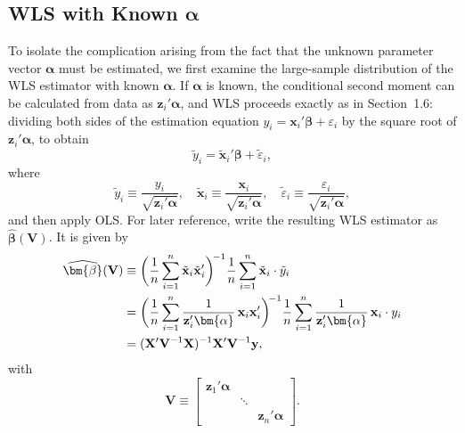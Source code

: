 \subsection*{WLS with Known $\bm{\alpha}$}

To isolate the complication arising from the fact that the unknown parameter vector
$\bm{\alpha}$ must be estimated, we first examine the large-sample distribution of the
WLS estimator with known $\bm{\alpha}$.  If $\bm{\alpha}$ is known, the conditional
second moment can be calculated from data as $\mathbf{z}_i' \bm{\alpha}$, and WLS
proceeds exactly as in Section~1.6: dividing both sides of the estimation equation
$y_i = \mathbf{x}_i' \bm{\beta} + \varepsilon_i$ by the square root of
$\mathbf{z}_i' \bm{\alpha}$, to obtain
\begin{equation}
  \tilde{y}_i = \tilde{\mathbf{x}}_i' \bm{\beta} + \tilde{\varepsilon}_i,
  \label{eq:2.8.3}
\end{equation}
where
\[
  \tilde{y}_i \equiv \frac{y_i}{\sqrt{\mathbf{z}_i' \bm{\alpha}}}, \quad
  \tilde{\mathbf{x}}_i \equiv \frac{\mathbf{x}_i}{\sqrt{\mathbf{z}_i' \bm{\alpha}}},
    \quad
  \tilde{\varepsilon}_i \equiv \frac{\varepsilon_i}{\sqrt{\mathbf{z}_i' \bm{\alpha}}},
\]
and then apply OLS.  For later reference, write the resulting WLS estimator as
$\widehat{\bm{\beta}}(\mathbf{V})$.  It is given by
\begin{align}
  \widehat{\bm{\beta}}(\mathbf{V})
    &\equiv \biggl(\frac{1}{n} \sum_{i=1}^{n}
      \tilde{\mathbf{x}}_i \tilde{\mathbf{x}}_i'\biggr)^{\!-1}
      \frac{1}{n} \sum_{i=1}^{n}
      \tilde{\mathbf{x}}_i \cdot \tilde{y}_i \notag \\
    &= \biggl(\frac{1}{n} \sum_{i=1}^{n}
      \frac{1}{\mathbf{z}_i' \bm{\alpha}}\,
      \mathbf{x}_i \mathbf{x}_i'\biggr)^{\!-1}
      \frac{1}{n} \sum_{i=1}^{n}
      \frac{1}{\mathbf{z}_i' \bm{\alpha}}\,
      \mathbf{x}_i \cdot y_i \notag \\
    &= (\mathbf{X}' \mathbf{V}^{-1} \mathbf{X})^{-1}
      \mathbf{X}' \mathbf{V}^{-1} \mathbf{y},
  \label{eq:2.8.4}
\end{align}
with
\[
  \mathbf{V} \equiv \begin{bmatrix}
    \mathbf{z}_1' \bm{\alpha} & & \\
    & \ddots & \\
    & & \mathbf{z}_n' \bm{\alpha}
  \end{bmatrix}.
\]

